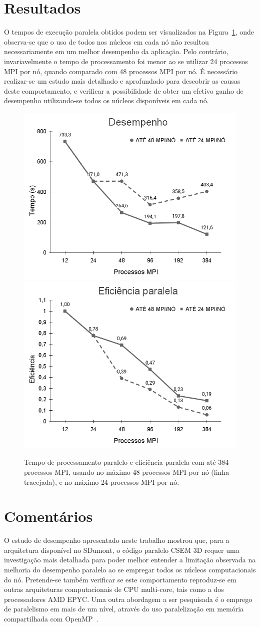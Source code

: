 \documentclass[12pt]{article}
\begin{document}
\section{Resultados}
%
O tempos de execução paralela obtidos podem ser visualizados na Figura~\ref{fig:perfpernode}, onde observa-se que o uso de todos nos núcleos em cada nó não resultou necessariamente em um melhor desempenho da aplicação. Pelo contrário, invariavelmente o tempo de processamento foi menor ao se utilizar 24 processos MPI por nó, quando comparado com 48 processos MPI por nó.
É necessário realizar-se um estudo mais detalhado e aprofundado para descobrir as causas deste comportamento, e verificar a possibilidade de obter um efetivo ganho de desempenho utilizando-se todos os núcleos disponíveis em cada nó.
%
\begin{figure}[ht]
\centering
\includegraphics[width=.45\textwidth]{figures/perfpernode.png}\includegraphics[width=.45\textwidth]{figures/eficiencia.png}
\caption{Tempo de processamento paralelo e eficiência paralela com até 384 processos MPI, usando no máximo 48 processos MPI por nó (linha tracejada), e no máximo 24 processos MPI por nó.}
\label{fig:perfpernode}
\end{figure}


\section{Comentários}
O estudo de desempenho apresentado neste trabalho mostrou que, para a arquitetura disponível no SDumont, o código paralelo CSEM 3D requer uma investigação mais detalhada para poder melhor entender a limitação observada na melhoria do desempenho paralelo ao se empregar todos os núcleos computacionais do nó. Pretende-se também verificar se este comportamento reproduz-se em outras arquiteturas computacionais de CPU multi-core, tais como a dos processadores AMD EPYC\texttrademark. Uma outra abordagem a ser pesquisada é o emprego de paralelismo em mais de um nível, através do uso paralelização em memória compartilhada com OpenMP~\cite{OpenMP}.
\end{document}
